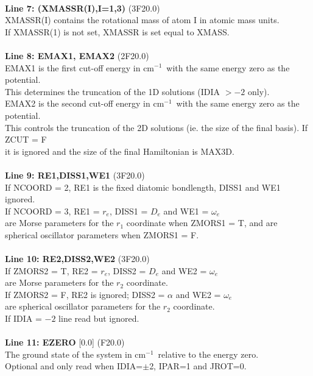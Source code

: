 \documentclass{elsart}
\def\cm{{cm$^{-1}$}}
\begin{document}
\begin{tabbing}
\\
{\bf Line 7: (XMASSR(I),I=1,3)} (3F20.0)\\
XMASSR(I) \> contains the rotational mass of atom I in atomic mass units. \\
If XMASSR(1) is not set, XMASSR is set equal to XMASS.\\
\\
{\bf Line 8: EMAX1, EMAX2} (2F20.0)\\
EMAX1 \> is the first cut-off energy in \cm\ with the same energy zero as the
potential. \\
This determines the truncation of the 1D solutions (IDIA $> - 2$ only).\\
EMAX2 \> is the second cut-off energy in \cm\ with the same energy zero as the
potential. \\
This controls the truncation of the 2D solutions (ie. the size of
the final basis). If ZCUT = F \\ it is ignored and the size of the final
Hamiltonian is MAX3D. \\
\\
{\bf Line 9: RE1,DISS1,WE1} (3F20.0)\\
If NCOORD = 2, RE1 is the fixed diatomic bondlength, DISS1 and WE1 ignored.\\
If NCOORD = 3, RE1 = $r_e$, DISS1 = $D_e$ and WE1 = $\omega_e$\\
\>  are Morse parameters for the $r_1$ coordinate when ZMORS1 = T, and are\\
\>  spherical oscillator parameters when ZMORS1 = F. \\
\\
{\bf Line 10: RE2,DISS2,WE2} (3F20.0)\\
If ZMORS2 = T, RE2 = $r_e$, DISS2 = $D_e$ and WE2 = $\omega_e$\\
\>  are Morse parameters for the $r_2$ coordinate.\\
If ZMORS2 = F, RE2 is ignored; DISS2 = $\alpha$ and WE2 = $\omega_e$ \\
\> are spherical oscillator parameters for the $r_2$ coordinate.\\
If IDIA = $-2$ line read but ignored.\\
\\
{\bf Line 11: EZERO} [0.0] (F20.0)\\
The ground state of the system in \cm\ relative to the energy zero. \\
Optional and only read  when IDIA=$\pm$2, IPAR=1 and JROT=0.\\
\end{tabbing}
\end{document}
